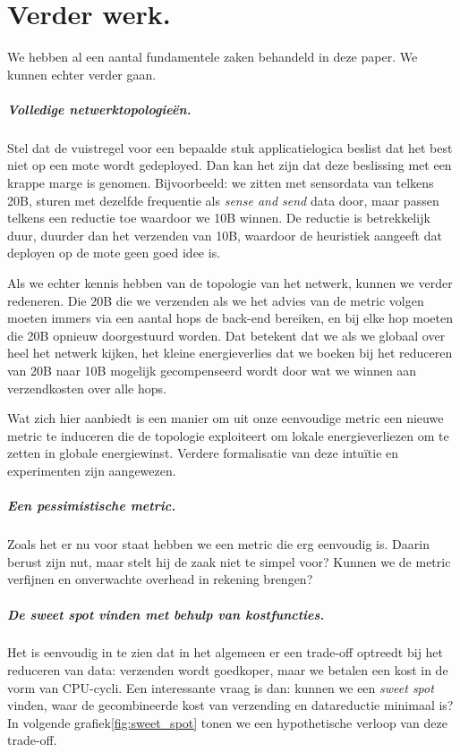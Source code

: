 \documentclass{article}
\begin{document}
\section{Verder werk.} 

We hebben al een aantal fundamentele zaken behandeld in deze paper. We kunnen
echter verder gaan.
 
\subparagraph{Volledige netwerktopologie\"en.}

Stel dat de vuistregel voor een bepaalde stuk applicatielogica beslist dat het
best niet op een mote wordt gedeployed. Dan kan het zijn dat deze beslissing met
een krappe marge is genomen. Bijvoorbeeld: we zitten met sensordata van telkens
20B, sturen met dezelfde frequentie als \textit{sense and send} data door, maar
passen telkens een reductie toe waardoor we 10B winnen. De reductie is
betrekkelijk duur, duurder dan het verzenden van 10B, waardoor de heuristiek
aangeeft dat deployen op de mote geen goed idee is. 

Als we echter kennis hebben van de topologie van het netwerk, kunnen we verder
redeneren. Die 20B die we verzenden als we het advies van de metric volgen
moeten immers via een aantal hops de back-end bereiken, en bij elke hop moeten
die 20B opnieuw doorgestuurd worden. Dat betekent dat we als we globaal over
heel het netwerk kijken, het kleine energieverlies dat we boeken bij het
reduceren van 20B naar 10B mogelijk gecompenseerd wordt door wat we winnen aan
verzendkosten over alle hops.

Wat zich hier aanbiedt is een manier om uit onze eenvoudige metric een nieuwe
metric te induceren die de topologie exploiteert om lokale energieverliezen om
te zetten in globale energiewinst. Verdere formalisatie van deze intu\"itie en
experimenten zijn aangewezen.

\subparagraph{Een pessimistische metric.}

Zoals het er nu voor staat hebben we een metric die erg eenvoudig is. Daarin
berust zijn nut, maar stelt hij de zaak niet te simpel voor? Kunnen we de metric
verfijnen en onverwachte overhead in rekening brengen? 




\subparagraph{De \textit{sweet spot} vinden met behulp van kostfuncties.}

Het is eenvoudig in te zien dat in het algemeen er een trade-off optreedt
bij het reduceren van data: verzenden wordt goedkoper, maar we betalen een kost
in de vorm van CPU-cycli. Een interessante vraag is dan: kunnen we een
\textit{sweet spot} vinden, waar de gecombineerde kost van verzending en
datareductie minimaal is?
\\
In volgende grafiek\ref{fig:sweet_spot} tonen we een hypothetische verloop van deze trade-off.
\end{document}
